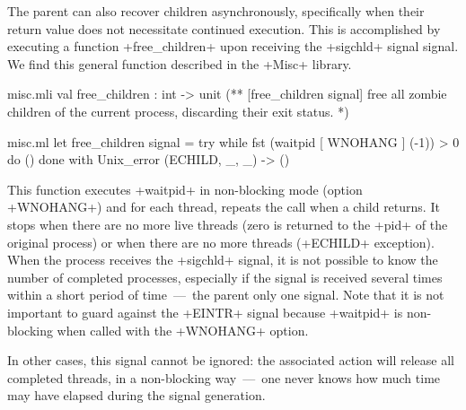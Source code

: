 \begin{example}
The parent can also recover children asynchronously, specifically
when their return value does not necessitate continued execution.
This is accomplished by executing a function \ml+free_children+ upon
receiving the \ml+sigchld+ signal signal.  We find this general function 
described in the \ml+Misc+ library.


%
\begin{codefile}{misc.mli}
val free_children : int -> unit
(** [free_children signal] free all zombie children of the current process, 
    discarding their exit status. *)
\end{codefile}
%
\begin{listingcodefile}{misc.ml}
let free_children signal = 
  try while fst (waitpid [ WNOHANG ] (-1)) > 0 do () done 
  with Unix_error (ECHILD, _, _) -> ()
\end{listingcodefile}
%
This function executes \ml+waitpid+ in non-blocking mode 
(option \ml+WNOHANG+) and for each thread, repeats
the call when a child returns.  It stops when there are
no more live threads (zero is returned to the \ml+pid+ of the
original process) or when there are no more threads
(\ml+ECHILD+ exception).  When the process receives the \ml+sigchld+ 
signal, it is not possible to know the number of completed processes, 
especially if the signal is received several times within a short 
period of time~---~the parent  only one signal.  Note that it 
is not important to guard against the \ml+EINTR+ signal because 
\ml+waitpid+ is non-blocking when called with the \ml+WNOHANG+ option.

In other cases, this signal cannot be ignored: the associated action
will release all completed threads, in a non-blocking way~---~one
never knows how much time may have elapsed during the signal
generation.
\end{example}

